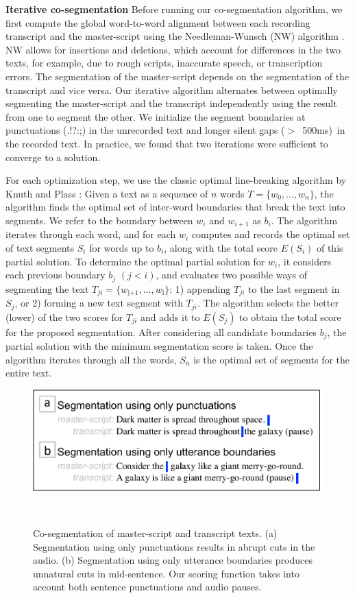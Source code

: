 \textbf{Iterative co-segmentation}
Before running our co-segmentation algorithm, we first compute the global word-to-word alignment between each recording transcript and the master-script using the Needleman-Wunsch (NW) algorithm \cite{needleman1970general}. NW allows for insertions and deletions, which account for differences in the two texts, for example, due to rough scripts, inaccurate speech, or transcription errors.
%
The segmentation of the master-script depends on the segmentation of the transcript and vice versa. Our iterative algorithm alternates between optimally segmenting the master-script and the transcript independently using the result from one to segment the other. We initialize the segment boundaries at punctuations (.!?:;) in the unrecorded text and longer silent gaps ($>$\ 500ms)\ in the recorded text. In practice, we
found that two iterations were sufficient to converge to a solution.


For each optimization step, we use the classic optimal line-breaking algorithm by Knuth and Plass \cite{knuth1981breaking}: Given a text as a sequence of $n$ words $T = \{w_0,\dots,w_n\}$, the algorithm finds the optimal set of inter-word
boundaries that break the text into segments. We refer to the boundary between $w_i$ and $w_{i+1}$ as
$b_i$.
%
The algorithm iterates through each word, and for each $w_i$
computes and records the optimal set of text segments $S_i$ for words up to $b_i$, along with the total score $E(S_i)$ of
this partial solution. To determine the optimal partial solution for $w_i$, it
considers each previous boundary $b_j$ $(j<i)$, and evaluates two possible ways of
segmenting the text $T_{ji} = \{w_\text{j+1},
\dots,w_\text{i}\}$: 1) appending $T_{ji}$ to the last segment in $S_j$, or 2) forming a new text segment with $T_{ji}$. The algorithm selects the better (lower) of the two scores for $T_{ji}$ and adds it
to $E(S_j)$ to obtain the total score for the proposed
segmentation. After considering all candidate boundaries $b_j$, the partial solution with the minimum segmentation score is taken. Once the algorithm iterates through all the words, $S_n$ is the
optimal set of segments for the entire text. 

\begin{figure}
\centering
  \includegraphics[width=1.0\columnwidth]{figures/scoringfunc.pdf}
  \caption{Co-segmentation of master-script and transcript texts. (a) Segmentation using only punctuations results in abrupt cuts in the audio. (b) Segmentation using only utterance boundaries produces unnatural cuts in mid-sentence. Our scoring function takes into account both sentence punctuations and audio pauses.}~\label{fig:scoringfunc}
\end{figure}

